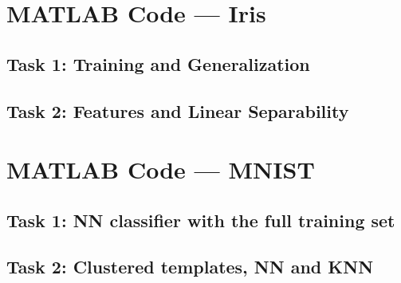 \documentclass[11pt,a4paper]{article}
\begin{document}
\appendix

\section{MATLAB Code --- Iris}
\label{app:iris_code}

\subsection{Task 1: Training and Generalization}


\subsection{Task 2: Features and Linear Separability}


\section{MATLAB Code --- MNIST}
\label{app:mnist_code}

\subsection{Task 1: NN classifier with the full training set}


\subsection{Task 2: Clustered templates, NN and KNN}

\end{document}
